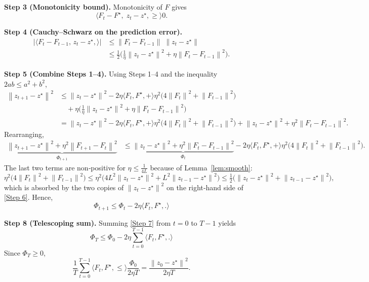\documentclass{article}
\newcommand{\norm}[1]{\left\|#1\right\|}
\newcommand{\ip}[2]{\langle #1,#2\rangle}
\begin{document}
\noindent\textbf{Step 3 (Monotonicity bound).}
Monotonicity of $F$ gives
\[
    \ip{F_t-F^\star,\;z_t-z^\star}\ge 0. \tag{Step 3}
\]

\noindent\textbf{Step 4 (Cauchy–Schwarz on the prediction error).}
\begin{align}
    \bigl|\ip{F_t-F_{t-1},\,z_t-z^\star}\bigr|
    &\le \norm{F_t-F_{t-1}}\;\norm{z_t-z^\star} \nonumber\\
    &\le \tfrac12\bigl(\tfrac{1}{\eta}\norm{z_t-z^\star}^2+\eta\norm{F_t-F_{t-1}}^2\bigr). \tag{Step 4}
\end{align}

\noindent\textbf{Step 5 (Combine Steps 1–4).}
Using Steps 1–4 and the inequality $2ab\le a^2+b^2$,
\begin{align}
    \norm{z_{t+1}-z^\star}^2
    &\le \norm{z_t-z^\star}^2
       -2\eta\ip{F_t,F^\star}
       +\eta^2\bigl(4\norm{F_t}^2+\norm{F_{t-1}}^2\bigr) \nonumber\\
    &\quad +\eta\bigl(\tfrac{1}{\eta}\norm{z_t-z^\star}^2+\eta\norm{F_t-F_{t-1}}^2\bigr) \nonumber\\
    &=\norm{z_t-z^\star}^2
       -2\eta\ip{F_t,F^\star}
       +\eta^2\bigl(4\norm{F_t}^2+\norm{F_{t-1}}^2\bigr)
       +\norm{z_t-z^\star}^2
       +\eta^2\norm{F_t-F_{t-1}}^2. \tag{Step 5}
\end{align}
Rearranging,
\begin{align}
    \underbrace{\norm{z_{t+1}-z^\star}^2+\eta^2\norm{F_{t+1}-F_t}^2}_{\Phi_{t+1}}
    &\le \underbrace{\norm{z_t-z^\star}^2+\eta^2\norm{F_t-F_{t-1}}^2}_{\Phi_t}
       -2\eta\ip{F_t,F^\star}
       +\eta^2\bigl(4\norm{F_t}^2+\norm{F_{t-1}}^2\bigr). \tag{Step 6}
\end{align}
The last two terms are non‑positive for $\eta\le\frac{1}{4L}$ because of Lemma~\ref{lem:smooth}:
\[
    \eta^2\bigl(4\norm{F_t}^2+\norm{F_{t-1}}^2\bigr)
    \le \eta^2\bigl(4L^2\norm{z_t-z^\star}^2+L^2\norm{z_{t-1}-z^\star}^2\bigr)
    \le \tfrac12\bigl(\norm{z_t-z^\star}^2+\norm{z_{t-1}-z^\star}^2\bigr),
\]
which is absorbed by the two copies of $\norm{z_t-z^\star}^2$ on the right‑hand side of \eqref{Step 6}.  Hence,
\begin{equation}
    \Phi_{t+1}\le \Phi_t-2\eta\ip{F_t,F^\star}. \tag{Step 7}
\end{equation}

\noindent\textbf{Step 8 (Telescoping sum).}
Summing \eqref{Step 7} from $t=0$ to $T-1$ yields
\[
    \Phi_T\le \Phi_0-2\eta\sum_{t=0}^{T-1}\ip{F_t,F^\star}.
\]
Since $\Phi_T\ge0$,
\[
    \frac{1}{T}\sum_{t=0}^{T-1}\ip{F_t,F^\star}
    \le \frac{\Phi_0}{2\eta T}
    =\frac{\norm{z_0-z^\star}^2}{2\eta T}. \tag{Step 8}
\]
\end{document}
